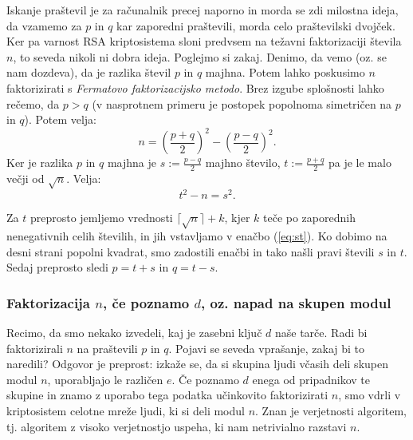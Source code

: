 \documentclass[a4paper, 12pt]{article} %
\begin{document}
Iskanje praštevil je za računalnik precej naporno in morda se zdi milostna ideja, da vzamemo za $p$ in $q$ kar zaporedni praštevili, morda celo praštevilski dvojček. Ker pa varnost RSA kriptosistema sloni predvsem na težavni faktorizaciji števila $n$, to seveda nikoli ni dobra ideja. Poglejmo si zakaj.
\newline
\newline
Denimo, da vemo (oz. se nam dozdeva), da je razlika števil $p$ in $q$ majhna. Potem lahko poskusimo $n$ faktorizirati s \emph{Fermatovo faktorizacijsko metodo}. Brez izgube splošnosti lahko rečemo, da $p > q$ (v nasprotnem primeru je postopek popolnoma simetričen na $p$ in $q$). Potem velja:
\begin{equation}
\label{eq:ffm}
n = \left(\frac{p+q}{2}\right)^2 - \left(\frac{p-q}{2}\right)^2.
\end{equation}
Ker je razlika $p$ in $q$ majhna je $s := \frac{p-q}{2}$ majhno število, $t := \frac{p+q}{2}$ pa je le malo večji od $\sqrt{n}$. Velja:
\begin{equation}
\label{eq:st}
t^2 - n = s^2.
\end{equation}

Za $t$ preprosto jemljemo vrednosti $\lceil \sqrt{n} \rceil + k$, kjer $k$ teče po zaporednih nenegativnih celih številih, in jih vstavljamo v enačbo (\ref{eq:st}). Ko dobimo na desni strani popolni kvadrat, smo zadostili enačbi in tako našli pravi števili $s$ in $t$.
\newline
\newline
Sedaj preprosto sledi $p = t + s$ in $q = t - s$.

\subsubsection{Faktorizacija $n$, če poznamo $d$, oz. napad na skupen modul}

Recimo, da smo nekako izvedeli, kaj je zasebni ključ $d$ naše tarče. Radi bi faktorizirali $n$ na praštevili $p$ in $q$. Pojavi se seveda vprašanje, zakaj bi to naredili? Odgovor je preprost: izkaže se, da si skupina ljudi včasih deli skupen modul $n$, uporabljajo le različen $e$. Če poznamo $d$ enega od pripadnikov te skupine in znamo z uporabo tega podatka učinkovito faktorizirati $n$, smo vdrli v kriptosistem celotne mreže ljudi, ki si deli modul $n$.
\newline
\newline
Znan je verjetnosti algoritem, tj. algoritem z visoko verjetnostjo uspeha, ki nam netrivialno razstavi $n$. \\
\end{document}
